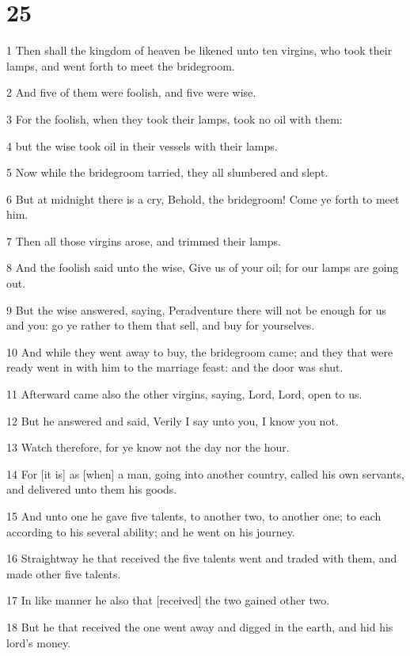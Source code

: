 \chapter{25}

\par 1 Then shall the kingdom of heaven be likened unto ten virgins, who took their lamps, and went forth to meet the bridegroom.
\par 2 And five of them were foolish, and five were wise.
\par 3 For the foolish, when they took their lamps, took no oil with them:
\par 4 but the wise took oil in their vessels with their lamps.
\par 5 Now while the bridegroom tarried, they all slumbered and slept.
\par 6 But at midnight there is a cry, Behold, the bridegroom! Come ye forth to meet him.
\par 7 Then all those virgins arose, and trimmed their lamps.
\par 8 And the foolish said unto the wise, Give us of your oil; for our lamps are going out.
\par 9 But the wise answered, saying, Peradventure there will not be enough for us and you: go ye rather to them that sell, and buy for yourselves.
\par 10 And while they went away to buy, the bridegroom came; and they that were ready went in with him to the marriage feast: and the door was shut.
\par 11 Afterward came also the other virgins, saying, Lord, Lord, open to us.
\par 12 But he answered and said, Verily I say unto you, I know you not.
\par 13 Watch therefore, for ye know not the day nor the hour.
\par 14 For [it is] as [when] a man, going into another country, called his own servants, and delivered unto them his goods.
\par 15 And unto one he gave five talents, to another two, to another one; to each according to his several ability; and he went on his journey.
\par 16 Straightway he that received the five talents went and traded with them, and made other five talents.
\par 17 In like manner he also that [received] the two gained other two.
\par 18 But he that received the one went away and digged in the earth, and hid his lord's money.
